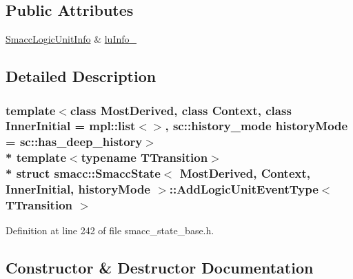 \subsection*{Public Attributes}
\begin{DoxyCompactItemize}
\item 
\hyperlink{structsmacc_1_1introspection_1_1SmaccLogicUnitInfo}{Smacc\+Logic\+Unit\+Info} \& \hyperlink{structsmacc_1_1SmaccState_1_1AddLogicUnitEventType_a31c27ea945cd0127080c0bae872c028e}{lu\+Info\+\_\+}
\end{DoxyCompactItemize}


\subsection{Detailed Description}
\subsubsection*{template$<$class Most\+Derived, class Context, class Inner\+Initial = mpl\+::list$<$$>$, sc\+::history\+\_\+mode history\+Mode = sc\+::has\+\_\+deep\+\_\+history$>$\\*
template$<$typename T\+Transition$>$\\*
struct smacc\+::\+Smacc\+State$<$ Most\+Derived, Context, Inner\+Initial, history\+Mode $>$\+::\+Add\+Logic\+Unit\+Event\+Type$<$ T\+Transition $>$}



Definition at line 242 of file smacc\+\_\+state\+\_\+base.\+h.



\subsection{Constructor \& Destructor Documentation}
